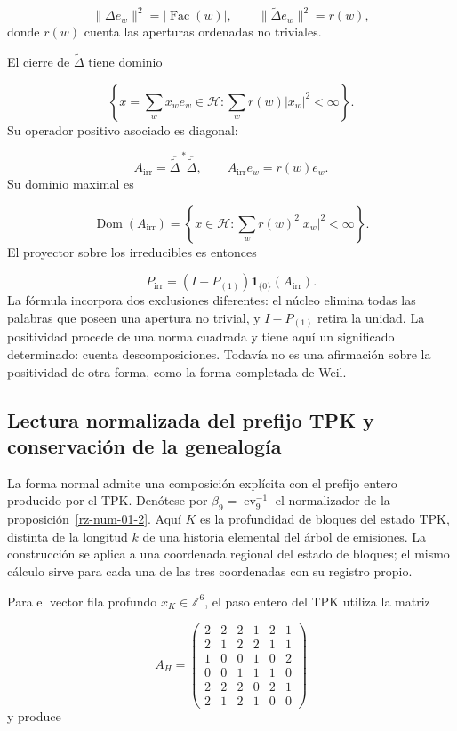 \[
\|\Delta e_w\|^2=|\operatorname{Fac}(w)|,
\qquad
\|\widetilde\Delta e_w\|^2=r(w),
\]
donde $r(w)$ cuenta las aperturas ordenadas no triviales.

El cierre de $\widetilde\Delta$ tiene dominio

\[
\left\{x=\sum_wx_we_w\in\mathcal H:\sum_wr(w)|x_w|^2<\infty\right\}.
\]
Su operador positivo asociado es diagonal:

\[
A_{\mathrm{irr}}=\overline{\widetilde\Delta}^{\,*}\overline{\widetilde\Delta},
\qquad A_{\mathrm{irr}}e_w=r(w)e_w.
\]
Su dominio maximal es

\[
\operatorname{Dom}(A_{\mathrm{irr}})
=\left\{x\in\mathcal H:\sum_wr(w)^2|x_w|^2<\infty\right\}.
\]
El proyector sobre los irreducibles es entonces

\[
P_{\mathrm{irr}}=(I-P_{(1)})\mathbf1_{\{0\}}(A_{\mathrm{irr}}).
\]
La fórmula incorpora dos exclusiones diferentes: el núcleo elimina todas las palabras que poseen una apertura no trivial, y $I-P_{(1)}$ retira la unidad. La positividad procede de una norma cuadrada y tiene aquí un significado determinado: cuenta descomposiciones. Todavía no es una afirmación sobre la positividad de otra forma, como la forma completada de Weil.

\subsection{Lectura normalizada del prefijo TPK y conservación de la genealogía}
La forma normal admite una composición explícita con el prefijo entero producido por el TPK. Denótese por \(\beta_9=\operatorname{ev}_9^{-1}\) el normalizador de la proposición~\ref{rz-num-01-2}. Aquí \(K\) es la profundidad de bloques del estado TPK, distinta de la longitud \(k\) de una historia elemental del árbol de emisiones. La construcción se aplica a una coordenada regional del estado de bloques; el mismo cálculo sirve para cada una de las tres coordenadas con su registro propio.

Para el vector fila profundo \(x_K\in\mathbb Z^6\), el paso entero del TPK utiliza la matriz

\[
A_H=
\begin{pmatrix}
2&2&2&1&2&1\\
2&1&2&2&1&1\\
1&0&0&1&0&2\\
0&0&1&1&1&0\\
2&2&2&0&2&1\\
2&1&2&1&0&0
\end{pmatrix}
\]
y produce

